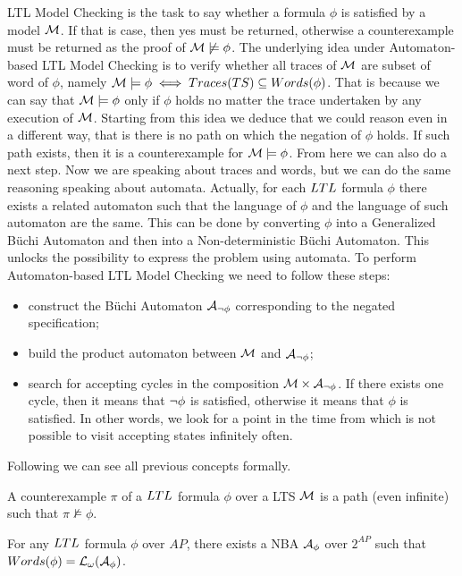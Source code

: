 LTL Model Checking is the task to say whether a formula $\phi$ is satisfied by a model $\mathcal{M}$. If that is case, then yes must be returned, otherwise a counterexample must be returned as the proof of $\mathcal{M} \not\models \phi$.
The underlying idea under Automaton-based LTL Model Checking is to verify whether all traces of $\mathcal{M}$ are subset of word of $\phi$, namely $\mathcal{M} \models \phi \iff Traces(TS) \subseteq Words(\phi)$. 
That is because we can say that $\mathcal{M} \models \phi$ only if $\phi$ holds no matter the trace undertaken by any execution of $\mathcal{M}$. 
Starting from this idea we deduce that we could reason even in a different way, that is there is no path on which the negation of $\phi$ holds. 
If such path exists, then it is a counterexample for $\mathcal{M} \models \phi$.
From here we can also do a next step. Now we are speaking about traces and words, but we can do the same reasoning speaking about automata.
Actually, for each $LTL$ formula $\phi$ there exists a related automaton such that the language of $\phi$ and the language of such automaton are the same. 
This can be done by converting $\phi$ into a Generalized B{\"u}chi Automaton and then into a Non-deterministic B{\"u}chi Automaton. 
This unlocks the possibility to express the problem using automata. 
To perform Automaton-based LTL Model Checking we need to follow these steps:
\begin{itemize}
    \item construct the B{\"u}chi Automaton $\mathcal{A}_{\neg \phi}$ corresponding to the negated specification;
    \item build the product automaton between $\mathcal{M}$ and $\mathcal{A}_{\neg \phi}$;
    \item search for accepting cycles in the composition $\mathcal{M} \times \mathcal{A}_{\neg \phi}$. If there exists one cycle, then it means that $\neg \phi$ is satisfied, otherwise it means that $\phi$ is satisfied. In other words, we look for a point in the time from which is not possible to visit accepting states infinitely often.
\end{itemize}
Following we can see all previous concepts formally.

\begin{definition}
A counterexample $\pi$ of a $LTL$ formula $\phi$ over a LTS $\mathcal{M}$ is a path (even infinite) such that $\pi \not\models \phi$.
\end{definition}

\begin{theorem}[\cite{VW86}]
For any $LTL$ formula $\phi$ over $AP$, there exists a NBA $\mathcal{A}_{\phi}$ over $2^{AP}$ such that $Words(\phi) = \mathcal{L}{}_\omega{(\mathcal{A}_{\phi})}$.
\end{theorem}

